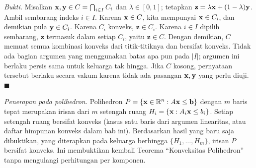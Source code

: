 \emph{Bukti.} Misalkan $\mathbf{x}, \mathbf{y} \in C = \bigcap_{i \in I} C_i$ dan $\lambda \in [0, 1]$; tetapkan $\mathbf{z} = \lambda\mathbf{x} + (1 - \lambda)\mathbf{y}$. Ambil sembarang indeks $i \in I$. Karena $\mathbf{x} \in C$, kita mempunyai $\mathbf{x} \in C_i$, dan demikian pula $\mathbf{y} \in C_i$. Karena $C_i$ konveks, $\mathbf{z} \in C_i$. Karena $i \in I$ dipilih sembarang, $\mathbf{z}$ termasuk dalam setiap $C_i$, yaitu $\mathbf{z} \in C$. Dengan demikian, $C$ memuat semua kombinasi konveks dari titik-titiknya dan bersifat konveks. Tidak ada bagian argumen yang menggunakan batas apa pun pada $|I|$; argumen ini berlaku persis sama untuk keluarga tak hingga. Jika $C$ kosong, pernyataan tersebut berlaku secara vakum karena tidak ada pasangan $\mathbf{x}, \mathbf{y}$ yang perlu diuji. $\blacksquare$

\emph{Penerapan pada polihedron.} Polihedron $P = \{\mathbf{x} \in \mathbb{R}^n : A\mathbf{x} \leq \mathbf{b}\}$ dengan $m$ baris tepat merupakan irisan dari $m$ setengah ruang $H_i = \{\mathbf{x} : A_i \mathbf{x} \leq b_i\}$. Setiap setengah ruang bersifat konveks (kasus satu baris dari argumen linearitas, atau daftar himpunan konveks dalam bab ini). Berdasarkan hasil yang baru saja dibuktikan, yang diterapkan pada keluarga berhingga $\{H_1, \dots, H_m\}$, irisan $P$ bersifat konveks. Ini membuktikan kembali Teorema “Konveksitas Polihedron” tanpa mengulangi perhitungan per komponen.
